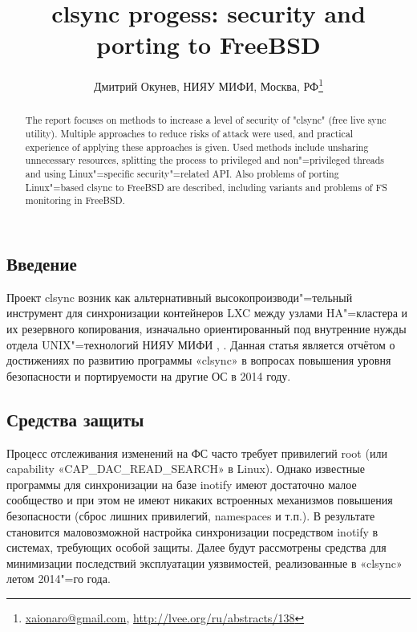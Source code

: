 \documentclass[10pt, a5paper]{article}
\begin{document}
\title{clsync progess: security and porting to FreeBSD}
\author{Дмитрий Окунев, НИЯУ МИФИ, Москва, РФ\footnote{\url{xaionaro@gmail.com}, \url{http://lvee.org/ru/abstracts/138}}}
\maketitle
\begin{abstract}
The report focuses on methods to increase a level of security of "clsync" (free live sync utility). Multiple approaches to reduce risks of attack were used, and practical experience of applying these approaches is given. Used methods include unsharing un\-necessary resources, splitting the process to privileged and non"=privileged threads and using Linux"=specific security"=related API. Also problems of porting Linux"=based clsync to FreeBSD are described, including variants and problems of FS monitoring in FreeBSD.
\end{abstract}
\subsection*{Введение}

Проект clsync возник как альтернативный высокопроизводи"=\linebreak тельный инструмент для синхронизации контейнеров LXC между узлами HA"=кластера и их резервного копирования, изначально ориентированный под внутренние нужды отдела UNIX"=технологий НИЯУ МИФИ \cite{Okunev1}, \cite{Okunev2}. Данная статья является отчётом о достижениях по развитию программы «clsync» в вопросах повышения уровня безопасности и портируемости на другие ОС в 2014 году.

\subsection*{Средства защиты}

Процесс отслеживания изменений на ФС часто требует  привилегий root (или capability «CAP\_DAC\_READ\_SEARCH» \cite{Okunev3} в Linux). Однако известные программы \cite{Okunev4} для синхронизации на базе inotify \cite{Okunev5} имеют достаточно малое сообщество и при этом не имеют никаких встроенных механизмов повышения безопасности (сброс лишних привилегий, namespaces и т.п.). В результате становится маловозможной настройка синхронизации посредством inotify в системах, требующих особой защиты. Далее будут рассмотрены средства для минимизации последствий эксплуатации уязвимостей, реализованные в «clsync» летом 2014"=го года.
\end{document}
